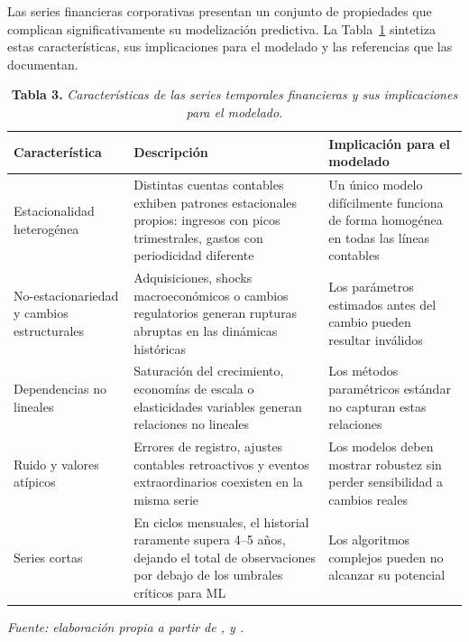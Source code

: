 Las series financieras corporativas presentan un conjunto de propiedades que complican significativamente su modelización predictiva. La Tabla~\ref{tab:caractserier} sintetiza estas características, sus implicaciones para el modelado y las referencias que las documentan.

\begin{table}[H]
\caption{\textbf{Tabla 3.} \textit{Características de las series temporales financieras y sus implicaciones para el modelado.}}
\label{tab:caractserier}
\vspace{4pt}
\begin{tabular}{>{\raggedright\arraybackslash}p{3cm} >{\raggedright\arraybackslash}p{5cm} >{\raggedright\arraybackslash}p{6cm}}
\toprule
\textbf{Característica} & \textbf{Descripción} & \textbf{Implicación para el modelado} \\
\midrule
Estacionalidad heterogénea & Distintas cuentas contables exhiben patrones estacionales propios: ingresos con picos trimestrales, gastos con periodicidad diferente & Un único modelo difícilmente funciona de forma homogénea en todas las líneas contables \\
No-estacionariedad y cambios estructurales & Adquisiciones, shocks macroeconómicos o cambios regulatorios generan rupturas abruptas en las dinámicas históricas & Los parámetros estimados antes del cambio pueden resultar inválidos \\
Dependencias no lineales & Saturación del crecimiento, economías de escala o elasticidades variables generan relaciones no lineales & Los métodos paramétricos estándar no capturan estas relaciones \parencite{Hyndman2021} \\
Ruido y valores atípicos & Errores de registro, ajustes contables retroactivos y eventos extraordinarios coexisten en la misma serie & Los modelos deben mostrar robustez sin perder sensibilidad a cambios reales \\
Series cortas & En ciclos mensuales, el historial raramente supera 4--5 años, dejando el total de observaciones por debajo de los umbrales críticos para ML & Los algoritmos complejos pueden no alcanzar su potencial \parencite{Cerqueira2022} \\
\bottomrule
\end{tabular}
\vspace{4pt}

\small\textit{Fuente: elaboración propia a partir de \textcite{Hyndman2021}, \textcite{Cerqueira2020} y \textcite{Petropoulos2022}.}
\end{table}

